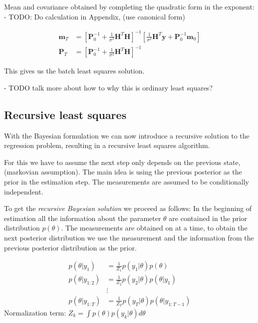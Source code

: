 Mean and covariance obtained by completing the quadratic form in the exponent:
- TODO: Do calculation in Appendix, (use canonical form)

\begin{align}
  \mathbf{m}_T &= \left[ \mathbf{P}^{-1}_0 + \frac{1}{\sigma^2} \mathbf{H}^T \mathbf{H}
                 \right]^{-1} \left[\frac{1}{\sigma^2} \mathbf{H}^T \mathbf{y} +
  \mathbf{P}^{-1}_0 \mathbf{m}_0 \right] \\
  \mathbf{P}_T &= \left[\mathbf{P}_0^{-1} + \frac{1}{\sigma^2} \mathbf{H}^T \mathbf{H}
                 \right]^{-1}
\end{align}

This gives us the batch least squares solution.

- TODO talk more about how to why this is ordinary least squares?

\subsection{Recursive least squares} \label{RLS}
With the Bayesian formulation we can now  introduce a recursive
solution to the regression problem, resulting in a recursive least squares
algorithm.

For this we have to assume the next step only
depends on the previous state, (markovian assumption).
The main idea is using the previous posterior as the prior in the estimation
step.
The measurements are assumed to be conditionally independent.

To get the \textit{recursive Bayesian solution} we proceed as follows:
In the beginning of estimation all the information about the parameter $\theta$
are contained in the prior distribution $p(\theta)$.
The measurements are obtained on at a time, to
obtain the next posterior distribution we use the measurement and the information
from the previous posterior distribution as the prior.

\begin{align*}
  p(\theta | y_{1}) &= \frac{1}{Z_1} p(y_1 | \theta) p(\theta) \\
  p(\theta | y_{1:2}) &= \frac{1}{Z_2} p(y_2 | \theta) p(\theta | y_1) \\
                    &\vdots \\
  p(\theta | y_{1:T}) &= \frac{1}{Z_T} p(y_T | \theta) p(\theta | y_{1:T-1})
\end{align*}
Normalization term: $Z_k = \int p(\theta) p(y_k | \theta) d\theta$ %



